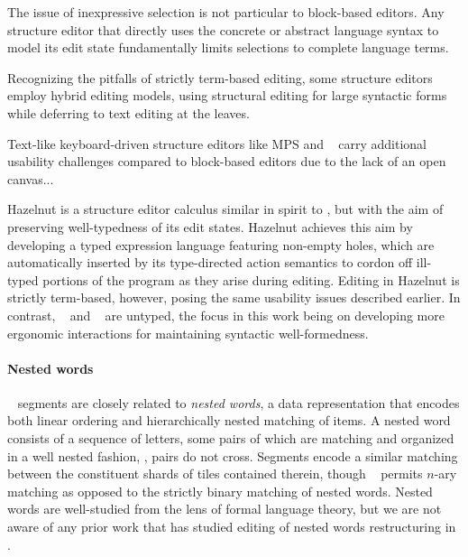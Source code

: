 The issue of inexpressive selection is not particular to
block-based editors.
Any structure editor that directly uses the
concrete or abstract language syntax to model
its edit state fundamentally limits selections to complete
language terms.


Recognizing the pitfalls of strictly term-based
editing, some structure editors
employ hybrid editing models, using structural editing
for large syntactic forms while deferring to text
editing at the leaves.


Text-like keyboard-driven structure editors
like MPS and \tylr~ carry additional usability challenges
compared to block-based editors due to the lack of an
open canvas...

Hazelnut \cite{Hazelnut} is a structure editor calculus
similar in spirit to \ty, but with the aim of
preserving well-typedness of its edit states.
Hazelnut achieves this aim by developing a typed
expression language featuring non-empty holes, which
are automatically inserted by its type-directed action
semantics to cordon off ill-typed portions of the program
as they arise during editing.
Editing in Hazelnut is strictly term-based, however, posing
the same usability issues described earlier.
In contrast, \ty~ and \tylr~ are untyped, the focus in
this work being on developing more ergonomic interactions
for maintaining syntactic well-formedness.


\paragraph{Nested words}
\ty~ segments are closely related to \emph{nested words},
a data representation that encodes both linear
ordering and hierarchically nested matching
of items.
A nested word consists of a sequence of letters,
some pairs of which are matching and organized
in a well nested fashion, \ie, pairs do not cross.
Segments encode a similar matching between the
constituent shards of tiles contained therein,
though \ty~ permits $n$-ary matching as opposed
to the strictly binary matching of nested words.
Nested words are well-studied from the lens of
formal language theory, but we are not aware of
any prior work that has studied editing of nested words
\ala restructuring in \tylr.

